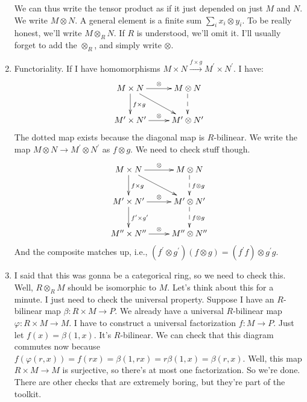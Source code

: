 \begin{enumerate}
We can thus write the tensor product as if it just depended on just $M$ and $N$. We write $M\otimes N$. A general element is a finite sum $\sum_i x_i\otimes y_i$. To be really honest, we'll write $M\otimes_R N$. If $R$ is understood, we'll omit it. I'll usually forget to add the $\otimes_R$, and simply write $\otimes$.
\item Functoriality. If I have homomorphisms $M\times N\xrightarrow{f\times g}M^\prime\times N^\prime$. I have:
\begin{equation*}
\xymatrix{M\times N\ar[d]^{f\times g}\ar[r]^\otimes\ar[dr] & M\otimes N\ar@{-->}[d]\\
M^\prime\times N^\prime\ar[r]^\otimes & M^\prime\otimes N^\prime}
\end{equation*}
The dotted map exists because the diagonal map is $R$-bilinear. We write the map $M\otimes N\to M^\prime \otimes N^\prime$ as $f\otimes g$. We need to check stuff though.
\begin{equation*}
\xymatrix{M\times N\ar[d]^{f\times g}\ar[r]^\otimes\ar[dr] & M\otimes N\ar@{-->}[d]^{f\otimes g}\\
M^\prime\times N^\prime\ar[r]^\otimes\ar[d]^{f^\prime\times g^\prime} & M^\prime\otimes N^\prime\ar@{-->}[d]^{f\otimes g}\\
M^{\prime\prime}\times N^{\prime\prime}\ar[r]^\otimes & M^{\prime\prime}\otimes N^{\prime\prime}}
\end{equation*}
And the composite matches up, i.e., $(f^\prime\otimes g^\prime)(f\otimes g)=(f^\prime f)\otimes g^\prime g$.
\item I said that this was gonna be a categorical ring, so we need to check this. Well, $R\otimes_R M$ should be isomorphic to $M$. Let's think about this for a minute. I just need to check the universal property. Suppose I have an $R$-bilinear map $\beta:R\times M\to P$. We already have a universal $R$-bilinear map $\varphi:R\times M\to M$. I have to construct a universal factorization $f:M\to P$. Just let $f(x)=\beta(1,x)$. It's $R$-bilinear. We can check that this diagram commutes now because $f(\varphi(r,x))=f(rx)=\beta(1,rx)=r\beta(1,x)=\beta(r,x)$. Well, this map $R\times M\to M$ is surjective, so there's at most one factorization. So we're done. There are other checks that are extremely boring, but they're part of the toolkit.


\end{enumerate}
